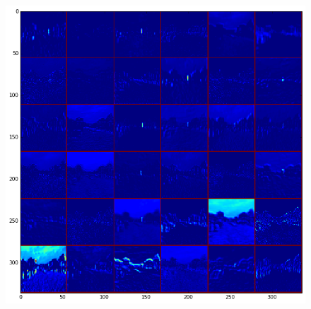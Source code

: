 \begin{figure}[htb]
{\begin{minipage}{0.3\textwidth}
		   		\includegraphics[width=1\textwidth]{cloudy1_conv1_fm}
		   		\label{fig:cloudy_conv1}
		\end{minipage}
    	} 
\end{figure}
